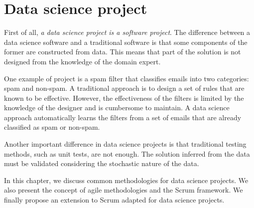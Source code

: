 \chapter{Data science project}
\label{chap:project}



First of all, \emph{a data science project is a software project}.  The difference between a data
science software and a traditional software is that some components of the former are
constructed from data.  This means that part of the solution is not designed from the
knowledge of the domain expert.

One example of project is a spam filter that
classifies emails into two categories: spam and non-spam.  A traditional approach is
to design a set of rules that are known to be effective.  However, the effectiveness of
the filters is limited by the knowledge of the designer and is cumbersome to maintain.  A
data science approach automatically learns the filters from a set of
emails that are already classified as spam or non-spam.

Another important difference in data science projects is that traditional testing methods,
such as unit tests, are not enough.  The solution inferred from the data must be validated
considering the stochastic nature of the data.

In this chapter, we discuss common methodologies for data science projects.  We also
present the concept of agile methodologies and the Scrum framework.  We finally propose an
extension to Scrum adapted for data science projects.

